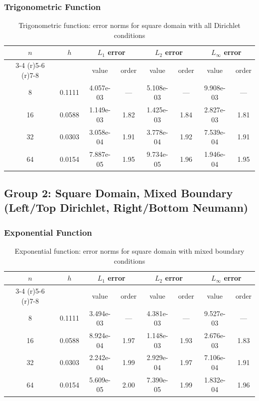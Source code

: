 \documentclass[12pt,a4paper]{article}
\begin{document}
\subsubsection{Trigonometric Function}
\begin{table}[H]
\centering
\caption{Trigonometric function: error norms for square domain with all Dirichlet conditions}
\begin{tabular}{cccccccc}
\toprule
$n$ & $h$ & \multicolumn{2}{c}{$L_1$ error} & \multicolumn{2}{c}{$L_2$ error} & \multicolumn{2}{c}{$L_\infty$ error} \\
\cmidrule(r){3-4} \cmidrule(r){5-6} \cmidrule(r){7-8}
& & value & order & value & order & value & order \\
\midrule
8  & 0.1111 & 4.057e-03 & --- & 5.108e-03 & --- & 9.908e-03 & --- \\
16 & 0.0588 & 1.149e-03 & 1.82 & 1.425e-03 & 1.84 & 2.827e-03 & 1.81 \\
32 & 0.0303 & 3.058e-04 & 1.91 & 3.778e-04 & 1.92 & 7.539e-04 & 1.91 \\
64 & 0.0154 & 7.887e-05 & 1.95 & 9.734e-05 & 1.96 & 1.946e-04 & 1.95 \\
\bottomrule
\end{tabular}
\end{table}

\subsection{Group 2: Square Domain, Mixed Boundary (Left/Top Dirichlet, Right/Bottom Neumann)}

\subsubsection{Exponential Function}
\begin{table}[H]
\centering
\caption{Exponential function: error norms for square domain with mixed boundary conditions}
\begin{tabular}{cccccccc}
\toprule
$n$ & $h$ & \multicolumn{2}{c}{$L_1$ error} & \multicolumn{2}{c}{$L_2$ error} & \multicolumn{2}{c}{$L_\infty$ error} \\
\cmidrule(r){3-4} \cmidrule(r){5-6} \cmidrule(r){7-8}
& & value & order & value & order & value & order \\
\midrule
8  & 0.1111 & 3.494e-03 & --- & 4.381e-03 & --- & 9.527e-03 & --- \\
16 & 0.0588 & 8.924e-04 & 1.97 & 1.148e-03 & 1.93 & 2.676e-03 & 1.83 \\
32 & 0.0303 & 2.242e-04 & 1.99 & 2.929e-04 & 1.97 & 7.106e-04 & 1.91 \\
64 & 0.0154 & 5.609e-05 & 2.00 & 7.390e-05 & 1.99 & 1.832e-04 & 1.96 \\
\bottomrule
\end{tabular}
\end{table}
\end{document}
